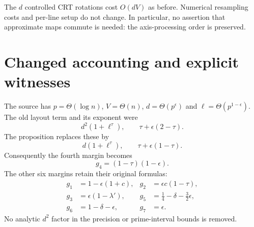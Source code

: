 \documentclass[11pt]{article}
\begin{document}
The $d$ controlled CRT rotations cost $O(dV)$ as before. Numerical resampling
costs and per-line setup do not change. In particular, no assertion that
approximate maps commute is needed: the axis-processing order is preserved.

\section{Changed accounting and explicit witnesses}
The source has $p=\Theta(\log n)$, $V=\Theta(n)$,
$d=\Theta(p^\epsilon)$ and $\ell=\Theta(p^{1-\epsilon})$. The old layout
term and its exponent were
\[
 d^2(1+\ell^\tau),\qquad \tau+\epsilon(2-\tau).
\]
The proposition replaces these by
\[
 d(1+\ell^\tau),\qquad \tau+\epsilon(1-\tau).
\]
Consequently the fourth margin becomes
\[
 g_4=(1-\tau)(1-\epsilon).
\]
The other six margins retain their original formulas:
\begin{align*}
 g_1&=1-\epsilon(1+c),&g_2&=\epsilon c(1-\tau),\\
 g_3&=\epsilon(1-\lambda'),&g_5&=\tfrac14-\delta-\tfrac32\epsilon,\\
 g_6&=1-\delta-\epsilon,&g_7&=\epsilon.
\end{align*}
No analytic $d^2$ factor in the precision or prime-interval bounds is removed.
\end{document}

